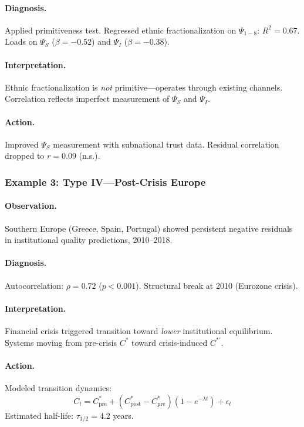 \paragraph{Diagnosis.}
Applied primitiveness test. Regressed ethnic fractionalization on $\Psi_{1-8}$: 
$R^2 = 0.67$. Loads on $\Psi_S$ ($\beta = -0.52$) and $\Psi_I$ ($\beta = -0.38$).

\paragraph{Interpretation.}
Ethnic fractionalization is \textit{not} primitive---operates through existing 
channels. Correlation reflects imperfect measurement of $\Psi_S$ and $\Psi_I$.

\paragraph{Action.}
Improved $\Psi_S$ measurement with subnational trust data. Residual correlation 
dropped to $r = 0.09$ (n.s.).

\subsubsection{Example 3: Type IV---Post-Crisis Europe}

\paragraph{Observation.}
Southern Europe (Greece, Spain, Portugal) showed persistent negative residuals 
in institutional quality predictions, 2010--2018.

\paragraph{Diagnosis.}
Autocorrelation: $\rho = 0.72$ ($p < 0.001$). Structural break at 2010 
(Eurozone crisis).

\paragraph{Interpretation.}
Financial crisis triggered transition toward \textit{lower} institutional 
equilibrium. Systems moving from pre-crisis $C^*$ toward crisis-induced $C^{*'}$.

\paragraph{Action.}
Modeled transition dynamics:
\begin{equation}
C_t = C^*_{\text{pre}} + (C^*_{\text{post}} - C^*_{\text{pre}})(1 - e^{-\lambda t}) + \epsilon_t
\end{equation}
Estimated half-life: $\tau_{1/2} = 4.2$ years.

